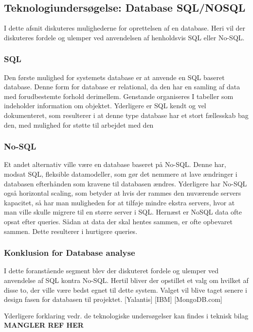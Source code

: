 \subsection{Teknologiundersøgelse: Database SQL/NOSQL
}
I dette afsnit diskuteres mulighederne for oprettelsen af en database. Heri vil der diskuteres fordele og ulemper ved anvendelsen af henholdsvis SQL eller No-SQL.

\subsubsection{SQL}
Den første mulighed for systemets database er at anvende en SQL baseret database. Denne form for database
er relational, da den har en samling af data med forudbestemte forhold derimellem. Genstande
organiseres I tabeller som indeholder information om objektet. Yderligere er SQL kendt og vel
dokumenteret, som resulterer i at denne type database har et stort fællesskab bag den, med mulighed
for støtte til arbejdet med den

\subsubsection{No-SQL}
Et andet alternativ ville være en database baseret på No-SQL. Denne har, modsat SQL, fleksible
datamodeller, som gør det nemmere at lave ændringer i databasen efterhånden som kravene til
databasen ændres. Yderligere har No-SQL også horizontal scaling, som betyder at hvis der rammes
den nuværende servers kapacitet, så har man muligheden for at tilføje mindre ekstra servers, hvor at man ville skulle migrere til en større server i SQL. Hernæst er NoSQL data ofte opsat efter queries. Sådan at data der skal hentes sammen,
er ofte opbevaret sammen. Dette resulterer i hurtigere queries.

\subsubsection{Konklusion for Database analyse}
I dette foranstående segment blev der diskuteret fordele og ulemper ved anvendelse af SQL kontra
No-SQL. Hertil bliver der opstillet et valg om hvilket af disse to, der ville være bedst egnet til dette
system. Valget vil blive taget senere i design fasen for databasen til projektet.
[Yalantis] [IBM] [MongoDB.com]

Yderligere forklaring vedr. de teknologiske undersøgelser kan findes i teknisk bilag \textbf{MANGLER REF HER}
